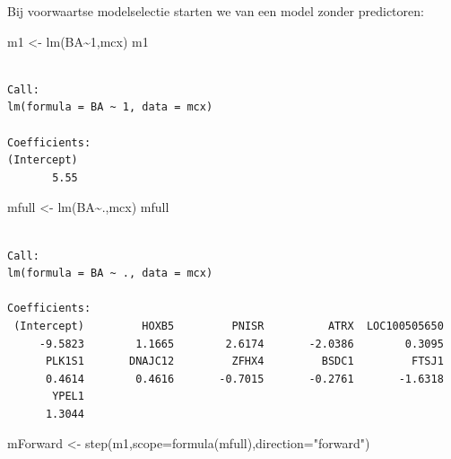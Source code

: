 \documentclass[
  dutch,
  letterpaper,
  12pt]{book}
\newenvironment{Shaded}{\begin{snugshade}}{\end{snugshade}}
\newcommand{\AttributeTok}[1]{\textcolor[rgb]{0.40,0.45,0.13}{#1}}
\newcommand{\DecValTok}[1]{\textcolor[rgb]{0.68,0.00,0.00}{#1}}
\newcommand{\FunctionTok}[1]{\textcolor[rgb]{0.28,0.35,0.67}{#1}}
\newcommand{\NormalTok}[1]{\textcolor[rgb]{0.00,0.23,0.31}{#1}}
\newcommand{\OtherTok}[1]{\textcolor[rgb]{0.00,0.23,0.31}{#1}}
\newcommand{\SpecialCharTok}[1]{\textcolor[rgb]{0.37,0.37,0.37}{#1}}
\newcommand{\StringTok}[1]{\textcolor[rgb]{0.13,0.47,0.30}{#1}}
\theoremstyle{definition}
\theoremstyle{definition}
\theoremstyle{definition}
\theoremstyle{remark}
\begin{document}
Bij voorwaartse modelselectie starten we van een model zonder
predictoren:

\begin{Shaded}
\begin{Highlighting}[]
\NormalTok{m1 }\OtherTok{\textless{}{-}} \FunctionTok{lm}\NormalTok{(BA}\SpecialCharTok{\textasciitilde{}}\DecValTok{1}\NormalTok{,mcx)}
\NormalTok{m1}
\end{Highlighting}
\end{Shaded}

\begin{verbatim}

Call:
lm(formula = BA ~ 1, data = mcx)

Coefficients:
(Intercept)  
       5.55  
\end{verbatim}

\begin{Shaded}
\begin{Highlighting}[]
\NormalTok{mfull }\OtherTok{\textless{}{-}} \FunctionTok{lm}\NormalTok{(BA}\SpecialCharTok{\textasciitilde{}}\NormalTok{.,mcx)}
\NormalTok{mfull}
\end{Highlighting}
\end{Shaded}

\begin{verbatim}

Call:
lm(formula = BA ~ ., data = mcx)

Coefficients:
 (Intercept)         HOXB5         PNISR          ATRX  LOC100505650  
     -9.5823        1.1665        2.6174       -2.0386        0.3095  
      PLK1S1       DNAJC12         ZFHX4         BSDC1         FTSJ1  
      0.4614        0.4616       -0.7015       -0.2761       -1.6318  
       YPEL1  
      1.3044  
\end{verbatim}

\begin{Shaded}
\begin{Highlighting}[]
\NormalTok{mForward }\OtherTok{\textless{}{-}} \FunctionTok{step}\NormalTok{(m1,}\AttributeTok{scope=}\FunctionTok{formula}\NormalTok{(mfull),}\AttributeTok{direction=}\StringTok{"forward"}\NormalTok{)}
\end{Highlighting}
\end{Shaded}
\end{document}
